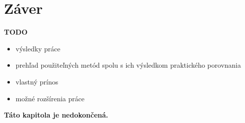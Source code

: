 \chapter*{Záver}  %

\textbf{TODO}
\begin{itemize}
	\item výsledky práce
	\item prehľad použiteľných metód spolu s ich výsledkom praktického porovnania
	\item vlastný prínos
	\item možné rozšírenia práce 

\end{itemize}

\textbf{Táto kapitola je nedokončená.}